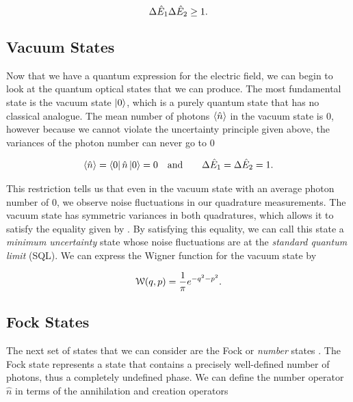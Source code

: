 \begin{equation}
  \label{eq:quadrature_hup}
  \Delta \hat{E}_1 \Delta \hat{E}_2 \ge 1.
\end{equation}




\subsection{Vacuum States}
\label{vacuum_states} 

Now that we have a quantum expression for the electric field, we can begin to
look at the quantum optical states that we can produce.  The most fundamental
state is the vacuum state $\left| 0 \right>$, which is a purely quantum state that has no classical analogue.  The mean number of photons $\left< \hat{n} \right>$ in the vacuum state is $0$, however because we cannot violate the uncertainty principle given above, the variances of the photon number can never go to $0$

\begin{eqnarray}
  \label{eq:vacuum}
  \left< \hat{n} \right> = \left< 0 \right| \hat{n} \left| 0 \right> = 0   \quad & \text{and} \quad  & \Delta \hat{E}_1 = \Delta \hat{E}_2 = 1.
\end{eqnarray}

\noindent
This restriction tells us that even in the vacuum state with an average photon number of $0$, we observe noise fluctuations in our quadrature measurements.  The vacuum state has symmetric variances in both quadratures, which allows it to satisfy the equality given by .  By satisfying this equality, we can call this state a \emph{minimum uncertainty} state whose noise fluctuations are at the \emph{standard quantum limit} (SQL).  We can express the Wigner function for the vacuum state by \cite{leonhardt1997measuring}

\begin{equation}
  \label{eq:wigner_vacuum}
  \mathcal{W}(q,p) = \frac{1}{\pi} e^{-q^2-p^2}.
\end{equation}




\subsection{Fock States}
\label{fock_states} 

The next set of states that we can consider are the Fock or \emph{number} states \cite{fox2006quantum}.  The Fock state represents a state that contains a precisely well-defined number of photons, thus a completely undefined phase. We can define the number operator $\hat{n}$ in terms of the annihilation and creation operators

